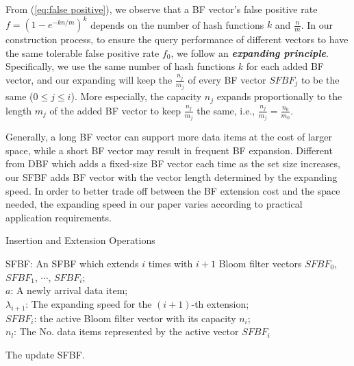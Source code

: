 \documentclass[10pt,journal,compsoc]{IEEEtran}
\begin{document}
From (\ref{eq:false positive}), we observe that a BF vector's false positive rate $f = {\left( {1 - {e^{ - kn/m}}} \right)^k}$ depends on the number of hash functions $k$ and $\frac{n}{m}$. In our construction process, to ensure the query performance of different vectors to have the same tolerable false positive rate $f_0$, we follow an \emph{\textbf{expanding principle}}. Specifically, we use the same number of hash functions $k$ for each added BF vector, and our expanding will keep the $\frac{{{n_j}}}{{{m_j}}}$ of every BF vector $SFBF_j$ to be the same ($0 \le j \le i$). More especially, the capacity $n_j$ expands proportionally to the length $m_j$ of the added BF vector to keep $\frac{n_j}{m_j}$ the same, i.e., $\frac{{{n_j}}}{{{m_j}}} = \frac{{{n_0}}}{{{m_0}}}$.





Generally, a long BF vector can support more data items at the cost of larger space, while a short BF vector may result in frequent BF expansion. Different from DBF \cite{guo2006theory, wei2010mad2} which adds a fixed-size BF vector each time as the set size increases,  our SFBF adds BF vector with the vector length  determined by the expanding speed. In order to better trade off between the BF extension cost and the space needed, the expanding speed in our paper varies according to practical application requirements.



\begin{algorithm}[h]
\caption{Insertion and Extension Operations}
\label{alg:Insertion Operations}
\begin{algorithmic}[1]
\REQUIRE
SFBF: An SFBF which extends $i$ times with $i+1$ Bloom filter vectors $SFBF_0$, $SFBF_1$, $\cdots$, $SFBF_i$;\\
$a$: A newly arrival data item; \\
$\lambda_{i+1}$: The expanding speed for the  $(i+1)$-th extension;\\
$SFBF_i$: the active Bloom filter vector with its capacity $n_i$;\\
$n_l$: The No. data items represented by the active vector $SFBF_i$


\ENSURE
The update SFBF.\\

\ENDIF
{}
\ENDFOR
{}
\end{algorithmic}
\end{algorithm}
\end{document}
